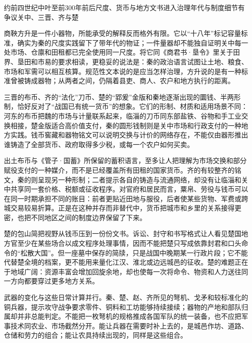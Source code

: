 \begin{event}{约前四世纪中叶至前300年前后}{尺度、货币与地方文书进入治理}{年代与制度细节有争议}{关中、三晋、齐与楚}

商鞅方升是一件小器物，所能承受的解释反而格外有限。它以“十八年”标记容量标准，确实为秦的尺度实践留下了带年代的物证；一件量器却不能独自证明关中每一处市场、仓廪和田租都已完全使用同一尺度。将它同《商君书·垦令》里关于田界、垦田和市易的要求相读，更稳妥的说法是：秦的政治语言试图让土地、粮食、市场和军需可以相互核算。规范性文本说的是应当怎样治理，方升说的是有一种标准曾被铸成器物；从两者之间，仍隔着县吏、商人、农户和地方执行的距离。

三晋的布币、齐的“法化”刀币、楚的“郢爰”金版和秦地逐渐出现的圜钱、半两形制，恰好反对了“战国已有统一货币”的想象。它们的形制、材质和适用场景不同：河东的布币把魏的市场与计量联系起来，临淄的刀币同东部盐铁、谷物和手工业交换相接，楚金版适合高价值支付，秦的圆形钱制则是关中市场和行政支付的一种地方实践。钱币窖藏和器物铭文可以说明交换与计价的网络存在，不能仅由器形推出谁铸造了全部货币、政府取得多少税，或每一个农户如何买卖。

出土布币与《管子·国蓄》所保留的蓄积语言，至多让人把理解为市场交换和部分赋役支付的一种媒介，而不是已经覆盖所有田租的国家货币。齐的有较整齐的铭文，秦的则呈现另一种形制；二者提示各自的铸造与流通网络，却没有让临淄和关中共享同一套价格、税额或征收程序。对官府和居民而言，粟帛、劳役与钱币可以在同一时期承担不同的账目：前者更贴近田地与服役，后者使某些货物、军费或跨城交易较易折算。正是在这种并存而非替代中，货币把城市和乡里的关系接得更密，也把不同地区之间的制度边界保留了下来。

楚的包山简把视野从钱币压到一份份文书。诉讼、封守和书写格式让人看见楚国地方官至少在某些场合以成文程序处理事情，因而不能把楚只写成依靠封君和口头命令的“松散大国”。但一座墓中保存的简牍，只是战国中晚期某一行政片段；它不能代替楚全境的档案，更不能用来量化江汉、淮北或边远城邑的征收。楚的难题正在于地域广阔：资源丰富会增加回旋余地，却也使每一次将命令、物资和人力送往同一方向都要穿过更多地方关系。

武器的变化与这些日常计算并行。秦、楚、赵、齐所见的弩机、戈矛和较标准化的铜兵器，提示攻守战争要求零件、铜料和工坊能够持续接续；器物的产地和部队归属却并非总能判定。不能把一枚弩机的规格推成各国军队的统一装备，也不应把军事技术同农业、市场截然分开。能让兵器在需要时补上去的，是城邑作坊、道路、仓储和劳力的组合；能让农具持续出现的，同样是这些组合。
\end{event}

